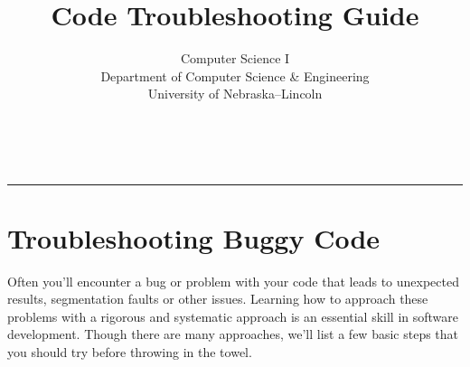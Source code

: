 \documentclass[12pt]{scrartcl}
\title{Code Troubleshooting Guide}\let\Title\@title
\subtitle{Computer Science I\\
{\small
\vskip1cm
Department of Computer Science \& Engineering \\
University of Nebraska--Lincoln}
\vskip-1cm}
\date{~}
\begin{document}
\maketitle

\hrule

\section*{Troubleshooting Buggy Code}

Often you'll encounter a bug or problem with your code that 
leads to unexpected results, segmentation faults or other issues.  
Learning how to approach these problems with a rigorous and
systematic approach is an essential skill in software development.
Though there are many approaches, we'll list a few basic steps
that you should try before throwing in the towel.
\end{document}
